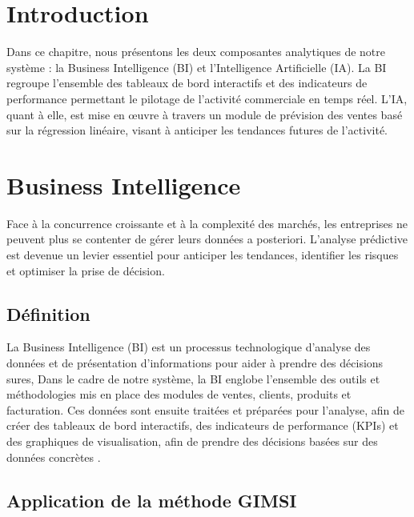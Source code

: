 
\section{Introduction}

Dans ce chapitre, nous présentons les deux composantes analytiques de notre système :
la Business Intelligence (BI) et l'Intelligence Artificielle (IA). La BI regroupe
l'ensemble des tableaux de bord interactifs et des indicateurs de performance permettant
le pilotage de l'activité commerciale en temps réel. L'IA, quant à elle, est mise en
œuvre à travers un module de prévision des ventes basé sur la régression linéaire,
visant à anticiper les tendances futures de l'activité.

\section{Business Intelligence}

Face à la concurrence croissante et à la complexité des marchés, les entreprises
ne peuvent plus se contenter de gérer leurs données a posteriori. L'analyse prédictive
est devenue un levier essentiel pour anticiper les tendances, identifier les risques
et optimiser la prise de décision.

\subsection{Définition}

La Business Intelligence (BI) est un processus technologique d'analyse des données
et de présentation d'informations pour aider à prendre des décisions sures,
Dans le cadre de notre système, la BI englobe l'ensemble des outils et méthodologies
mis en place des modules de ventes, clients, produits et facturation. Ces données
sont ensuite traitées et préparées pour l'analyse, afin de créer des tableaux de bord
interactifs, des indicateurs de performance (KPIs) et des graphiques de visualisation,
afin de prendre des décisions basées sur des données concrètes \cite{oracle_bi}.

\subsection{Application de la méthode GIMSI}

